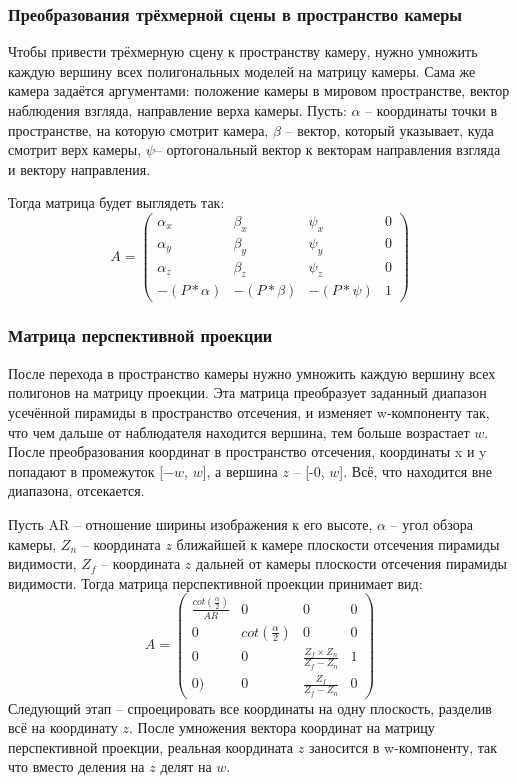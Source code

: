 \subsubsection{Преобразования трёхмерной сцены в пространство камеры}
Чтобы привести трёхмерную сцену к пространству камеру, нужно умножить каждую вершину всех полигональных моделей на матрицу камеры. 
Сама же камера задаётся аргументами: положение камеры в мировом пространстве, вектор наблюдения взгляда, направление верха камеры.
Пусть:
$\alpha$ – координаты точки в пространстве, на которую смотрит камера, 
$\beta$ – вектор, который указывает, куда смотрит верх камеры,
$\psi$– ортогональный вектор к векторам направления взгляда и вектору направления.

Тогда матрица будет выглядеть так:
\begin{equation*}
	A = \left(
	\begin{array}{cccc}
		\alpha_x & \beta_x & \psi_x & 0\\
		\alpha_y & \beta_y & \psi_y & 0 \\
		\alpha_z & \beta_z & \psi_z & 0 \\
		-(P*\alpha) & -(P*\beta) &-(P*\psi) & 1
	\end{array}
	\right)
\end{equation*}

\subsubsection{Матрица перспективной проекции}
После перехода в пространство камеры нужно умножить каждую вершину всех полигонов на матрицу проекции. 
Эта матрица преобразует заданный диапазон усечённой пирамиды в пространство отсечения, и изменяет w-компоненту так, что чем дальше от наблюдателя находится вершина, тем больше возрастает $ w $. 
После преобразования координат в пространство отсечения, координаты x и y попадают в промежуток [$-w$, $w$], а вершина $z$ – [-0, $w$]. 
Всё, что находится вне диапазона, отсекается.

Пусть AR – отношение ширины изображения к его высоте, $\alpha$ – угол обзора камеры, $Z_n$ – координата $z$ ближайшей к камере плоскости отсечения пирамиды видимости, 
$ Z_f $ – координата $z$ дальней от камеры плоскости отсечения пирамиды видимости. 
Тогда матрица перспективной проекции принимает вид:
\begin{equation*}
	A = \left(
	\begin{array}{cccc}
		\frac{cot(\frac{\alpha}{2})}{AR} & 0 & 0 & 0\\
		0 & cot(\frac{\alpha}{2}) & 0 & 0 \\
		0 & 0 & \frac{Z_f \times Z_n}{Z_f - Z_n} & 1 \\
		0) & 0 & \frac{Z_f}{Z_f - Z_n} & 0
	\end{array}
	\right)
\end{equation*}
Следующий этап – спроецировать все координаты на одну плоскость, разделив всё на координату $z$. После умножения вектора координат на матрицу перспективной проекции, реальная координата $z$ заносится в w-компоненту, так что вместо деления на $z$ делят на $w$.

